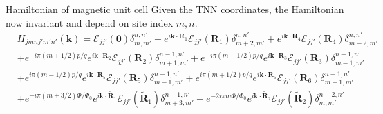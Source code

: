 \documentclass[aspectratio=169,compress,x11names]{beamer}
\begin{document}
	\begin{frame}{Hamiltonian of magnetic unit cell}
		Given the TNN coordinates, the Hamiltonian now invariant and depend on site index $m,n$.
		\begin{equation}
			\begin{aligned}
				&H_{jmnj'm'n'}(\mathbf{k})
				= \mathcal{E}_{jj'}(\mathbf{0}) \delta_{m,m'}^{n,n'} + e^{i\mathbf{k} \cdot \mathbf{R}_{1}}\mathcal{E}_{jj'}(\mathbf{R}_{1}) \delta_{m+2,m'}^{n,n'} + e^{i\mathbf{k} \cdot \mathbf{R}_{4}}\mathcal{E}_{jj'}(\mathbf{R}_{4})  \delta_{m-2,m'}^{n,n'}  \\
				& + e^{-i\pi(m + 1/2)p / q}e^{i\mathbf{k} \cdot \mathbf{R}_{2}} \mathcal{E}_{jj'}(\mathbf{R}_{2}) \delta_{m+1,m'}^{n-1,n'} + e^{-i\pi(m - 1/2)p / q} e^{i\mathbf{k} \cdot \mathbf{R}_{3}} \mathcal{E}_{jj'}(\mathbf{R}_{3}) \delta_{m-1,m'}^{n-1,n'} \\
				& + e^{i\pi(m - 1/2)p / q} e^{i\mathbf{k} \cdot \mathbf{R}_{5}} \mathcal{E}_{jj'}(\mathbf{R}_{5}) \delta_{m-1,m'}^{n+1,n'} + e^{i\pi(m + 1/2)p / q} e^{i\mathbf{k} \cdot \mathbf{R}_{6}} \mathcal{E}_{jj'}(\mathbf{R}_{6}) \delta_{m+1,m'}^{n+1,n'} \\
				& + e^{- i\pi(m + 3/2)\Phi/\Phi_{0} } e^{i \mathbf{k} \cdot \tilde{\mathbf{R}}_{1}} \mathcal{E}_{jj'}(\tilde{\mathbf{R}}_{1}) \delta_{m+3,m'}^{n-1,n'} + e^{- 2i\pi m\Phi/\Phi_{0} } e^{i \mathbf{k} \cdot \tilde{\mathbf{R}}_{2}} \mathcal{E}_{jj'}(\tilde{\mathbf{R}}_{2}) \delta_{m,m'}^{n-2,n'} \\

\end{aligned}
\end{equation}
\end{frame}
\end{document}
